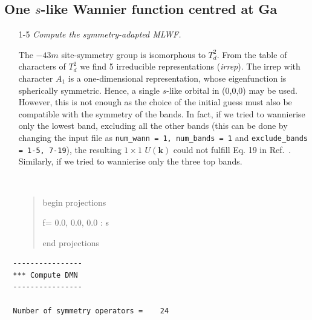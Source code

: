 \subsection*{One $s$-like Wannier function centred at Ga}
\begin{itemize}
	\item[1-5] {\it  Compute the symmetry-adapted MLWF.}

	The ${-}43m$ site-symmetry group is isomorphous to $T_d^2$. From the table of characters of $T_d^2$ we find 5 irreducible representations (\textit{irrep}). The irrep with character $A_1$ is a one-dimensional representation, whose eigenfunction is spherically symmetric. Hence, a single $s$-like orbital in (0,0,0) may be used. However, this is not enough as the choice of the initial guess must also be compatible with the symmetry of the bands. In fact, if we tried to wannierise only the lowest band, excluding all the other bands (this can be done by changing the input file as {\tt num\_wann = 1, num\_bands = 1} and {\tt exclude\_bands = 1-5, 7-19}), the resulting $1\times1$ $U(\mathbf{k})$ could not fulfill Eq. 19 in Ref.~. Similarly, if we tried to wannierise only the three top bands. 
	{\tt
	\begin{quote}
	begin projections
	
	f= 0.0, 0.0, 0.0 : s
	
	end projections
	\end{quote}
	}
\end{itemize}

 	\begin{tcolorbox}[sharp corners,boxrule=0.5pt]
 	{\small
 	\begin{verbatim}
  ----------------                                                                    
  *** Compute DMN                                                                     
  ----------------                                                                    
                                                                                      
  Number of symmetry operators =    24    
	\end{verbatim}
	}
	\end{tcolorbox}

